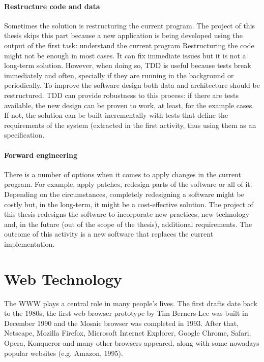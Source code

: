 \paragraph{Restructure code and data}
Sometimes the solution is restructuring the current program.
The project of this thesis skips this part because a new application is being developed using the output of the first task: understand the current program
Restructuring the code might not be enough in most cases. 
It can fix immediate issues but it is not a long-term solution.
However, when doing so, \ac{TDD} is useful because tests break immediately and often, specially if they are running in the background or periodically.
To improve the software design both data and architecture should be restructured.
\ac{TDD} can provide robustness to this process: if there are tests available, the new design can be proven to work, at least, for the example cases. 
If not, the solution can be built incrementally with tests that define the requirements of the system (extracted in the first activity, thus using them as an specification.

\paragraph{Forward engineering}
There is a number of options when it comes to apply changes in the current program. 
For example, apply patches, redesign parts of the software or all of it.
Depending on the circumstances, completely redesigning a software might be costly but, in the long-term, it might be a cost-effective solution.
The project of this thesis redesigns the software to incorporate new practices, new technology and, in the future (out of the scope of the thesis), additional requirements.
The outcome of this activity is a new software that replaces the current implementation.


\section{Web Technology}
The \ac{WWW} plays a central role in many people's lives.
The first drafts date back to the 1980s, the first web browser prototype by Tim Berners-Lee was built in December 1990 and the Mosaic browser was completed in 1993.
After that, Netscape, Mozilla Firefox, Microsoft Internet Explorer, Google Chrome, Safari, Opera, Konqueror and many other browsers appeared, along with some nowadays popular websites (e.g. Amazon, 1995).


